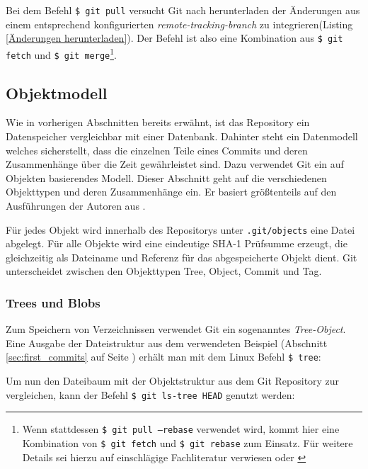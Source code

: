 Bei dem Befehl \texttt{\$ git pull} versucht Git nach herunterladen der
Änderungen aus einem entsprechend konfigurierten
\textit{remote-tracking-branch} zu integrieren(Listing \ref{Änderungen
herunterladen}). Der Befehl ist also eine Kombination aus \texttt{\$ git fetch}
und \texttt{\$ git merge}\footnote{Wenn stattdessen \texttt{\$ git pull
--rebase} verwendet wird, kommt hier eine Kombination von \texttt{\$ git fetch}
und \texttt{\$ git rebase} zum Einsatz. Für weitere Details sei hierzu auf
einschlägige Fachliteratur verwiesen \cite[144-152]{gitosp} oder
\cite[85-88]{progit}}.



\subsection{Objektmodell}\label{sec:objectmodel}
Wie in vorherigen Abschnitten bereits erwähnt, ist das Repository ein
Datenspeicher vergleichbar mit einer Datenbank. Dahinter steht ein Datenmodell
welches sicherstellt, dass die einzelnen Teile eines Commits und deren
Zusammenhänge über die Zeit gewährleistet sind. Dazu verwendet Git ein auf
Objekten basierendes Modell. Dieser Abschnitt geht auf die verschiedenen
Objekttypen und deren Zusammenhänge ein. Er basiert größtenteils auf den
Ausführungen der Autoren aus \cite[S.~49-59]{gitosp}.

Für jedes Objekt wird innerhalb des Repositorys unter \texttt{.git/objects}
eine Datei abgelegt. Für alle Objekte wird eine eindeutige \gls{SHA-1}
Prüfsumme erzeugt, die gleichzeitig als Dateiname und Referenz für das
abgespeicherte Objekt dient. Git unterscheidet zwischen den Objekttypen Tree,
Object, Commit und Tag.

\subsubsection{Trees und Blobs}\label{sec:treeblobobjects}
Zum Speichern von Verzeichnissen verwendet Git ein sogenanntes
\textit{Tree-Object}. Eine Ausgabe der Dateistruktur aus dem verwendeten
Beispiel (Abschnitt \ref{sec:first_commits} auf Seite
\pageref{sec:first_commits}) erhält man mit dem Linux Befehl \texttt{\$ tree}:



Um nun den Dateibaum mit der Objektstruktur aus dem Git Repository zur
vergleichen, kann der Befehl \texttt{\$ git ls-tree HEAD} genutzt werden:

